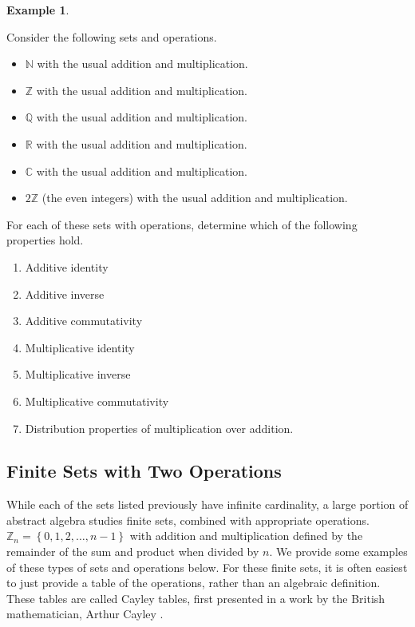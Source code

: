 \documentclass[
]{book}
\theoremstyle{definition}
\theoremstyle{definition}
\newtheorem{example}{Example}[chapter]
\theoremstyle{definition}
\theoremstyle{definition}
\theoremstyle{remark}
\begin{document}
\begin{example}
\protect\hypertarget{exm:rings}{}\label{exm:rings}

Consider the following sets and operations.

\begin{itemize}
\item
  \(\mathbb{N}\) with the usual addition and multiplication.
\item
  \(\mathbb{Z}\) with the usual addition and multiplication.
\item
  \(\mathbb{Q}\) with the usual addition and multiplication.
\item
  \(\mathbb{R}\) with the usual addition and multiplication.
\item
  \(\mathbb{C}\) with the usual addition and multiplication.
\item
  \(2\mathbb{Z}\) (the even integers) with the usual addition and multiplication.
\end{itemize}

For each of these sets with operations, determine which of the following properties hold.

\begin{enumerate}
\def\labelenumi{\arabic{enumi}.}
\item
  Additive identity
\item
  Additive inverse
\item
  Additive commutativity
\item
  Multiplicative identity
\item
  Multiplicative inverse
\item
  Multiplicative commutativity
\item
  Distribution properties of multiplication over addition.
\end{enumerate}

\end{example}

\hypertarget{finite-sets-with-two-operations}{%
\subsection{Finite Sets with Two Operations}\label{finite-sets-with-two-operations}}

While each of the sets listed previously have infinite cardinality, a large portion of abstract algebra studies finite sets, combined with appropriate operations. \(\mathbb{Z}_n = \left\{0, 1, 2, \ldots, n-1\right\}\) with addition and multiplication defined by the remainder of the sum and product when divided by \(n\). We provide some examples of these types of sets and operations below. For these finite sets, it is often easiest to just provide a table of the operations, rather than an algebraic definition. These tables are called Cayley tables, first presented in a work by the British mathematician, Arthur Cayley \citeyearpar{Cayley}.
\end{document}
